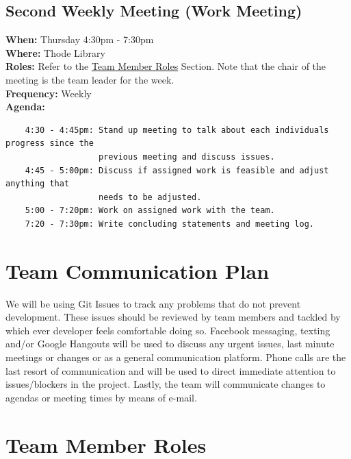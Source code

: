 \documentclass{article}
\begin{document}
\subsection{Second Weekly Meeting (Work Meeting)}
\textbf{When:} Thursday 4:30pm - 7:30pm\\
\textbf{Where:} Thode Library\\
\textbf{Roles:} Refer to the \hyperref[TeamMemberRoles]{Team Member Roles} Section. Note that the chair of the meeting is the team leader for the week. \\
\textbf{Frequency:} Weekly\\
\textbf{Agenda:}
\begin{verbatim}
    4:30 - 4:45pm: Stand up meeting to talk about each individuals progress since the
                   previous meeting and discuss issues.
    4:45 - 5:00pm: Discuss if assigned work is feasible and adjust anything that
                   needs to be adjusted. 
    5:00 - 7:20pm: Work on assigned work with the team.  
    7:20 - 7:30pm: Write concluding statements and meeting log.  
\end{verbatim}


\section{Team Communication Plan}
We will be using Git Issues to track any problems that do not prevent development. These issues should be reviewed by team members and tackled by which ever developer feels comfortable doing so. Facebook messaging, texting and/or Google Hangouts will be used to discuss any urgent issues, last minute meetings or changes or as a general communication platform. Phone calls are the last resort of communication and will be used to direct immediate attention to issues/blockers in the project. Lastly, the team will communicate changes to agendas or meeting times by means of e-mail.

\section{Team Member Roles}
\end{document}
